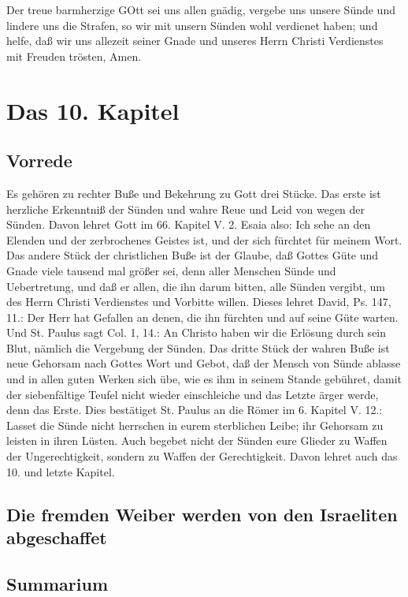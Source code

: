 Der treue barmherzige GOtt sei uns allen gnädig, vergebe uns unsere Sünde und lindere uns die Strafen, so wir mit unsern Sünden wohl verdienet haben; und helfe, daß wir uns allezeit seiner Gnade und unseres Herrn Christi Verdienstes mit Freuden trösten, Amen.

\chapter{Das 10. Kapitel}

\section{Vorrede}

Es gehören zu rechter Buße und Bekehrung zu Gott drei Stücke. Das erste ist herzliche Erkenntniß der Sünden und wahre Reue und Leid von wegen der Sünden. Davon lehret Gott im 66. Kapitel V. 2. Esaia also: Ich sehe an den Elenden und der zerbrochenes Geistes ist, und der sich fürchtet für meinem Wort. Das andere Stück der christlichen Buße ist der Glaube, daß Gottes Güte und Gnade viele tausend mal größer sei, denn aller Menschen Sünde und Uebertretung, und daß er allen, die ihn darum bitten, alle Sünden vergibt, um des Herrn Christi Verdienstes und Vorbitte willen. Dieses lehret David, Ps. 147, 11.: Der Herr hat Gefallen an denen, die ihn fürchten und auf seine Güte warten. Und St. Paulus sagt Col. 1, 14.: An Christo haben wir die Erlösung durch sein Blut, nämlich die Vergebung der Sünden. Das dritte Stück der wahren Buße ist neue Gehorsam nach Gottes Wort und Gebot, daß der Mensch von Sünde ablasse und in allen guten Werken sich übe, wie es ihm in seinem Stande gebühret, damit der siebenfältige Teufel nicht wieder einschleiche und das Letzte ärger werde, denn das Erste. Dies bestätiget St. Paulus an die Römer im 6. Kapitel V. 12.: Lasset die Sünde nicht herrschen in eurem sterblichen Leibe; ihr Gehorsam zu leisten in ihren Lüsten. Auch begebet nicht der Sünden eure Glieder zu Waffen der Ungerechtigkeit, sondern zu Waffen der Gerechtigkeit. Davon lehret auch das 10. und letzte Kapitel.

\section{Die fremden Weiber werden von den Israeliten abgeschaffet}


\section{Summarium}

